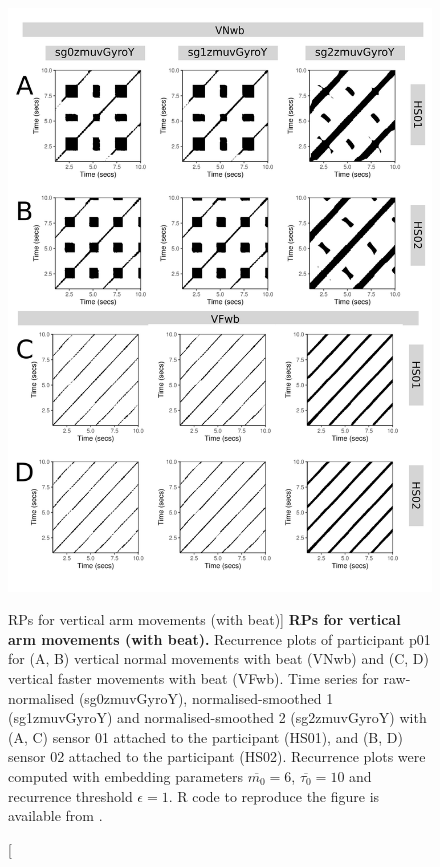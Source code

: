 \begin{figure}
\centering
\includegraphics[height=0.8\textheight]{fig_5_12}
\caption
	[RPs for vertical arm movements (with beat)]{
	{\bf RPs for vertical arm movements (with beat).}	
	Recurrence plots of participant p01 for 
	(A, B) vertical normal movements with beat (VNwb) and
	(C, D) vertical faster movements with beat (VFwb).
	Time series for raw-normalised (sg0zmuvGyroY), 
	normalised-smoothed 1 (sg1zmuvGyroY) and 
	normalised-smoothed 2 (sg2zmuvGyroY) with
	(A, C) sensor 01 attached to the participant (HS01), and
	(B, D) sensor 02 attached to the participant (HS02).
	Recurrence plots were computed with 
	embedding parameters $\overline{m_0}=6$, $\overline{\tau_0}=10$ and 
	recurrence threshold $\epsilon=1$.
	R code to reproduce the figure is available from \cite{xochicale2018}.
        }
    \label{fig:rps_Vwb_w500}
\end{figure}

